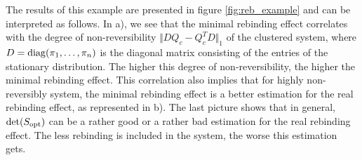 The results of this example are presented in figure \ref{fig:reb_example} and can be interpreted as follows.
In a), we see that the minimal rebinding effect correlates with the degree of non-reversibility $\Vert DQ_c - Q_c^T D \Vert_1$ of the clustered system, where $D = \mathrm{diag}(\pi_1, \dots, \pi_n)$ is the diagonal matrix consisting of the entries of the stationary distribution. %
The higher this degree of non-reversibility, the higher the minimal rebinding effect.
This correlation also implies that for highly non-reversibly system, the minimal rebinding effect is a better estimation for the real rebinding effect, as represented in b).
The last picture shows that in general, $\det(S_{\mathrm{opt}})$ can be a rather good or a rather bad estimation for the real rebinding effect.
The less rebinding is included in the system, the worse this estimation gets. %
\newpage












